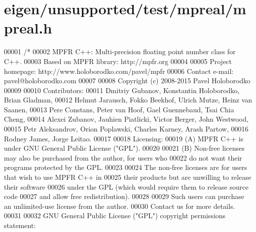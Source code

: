 \hypertarget{eigen_2unsupported_2test_2mpreal_2mpreal_8h_source}{}\section{eigen/unsupported/test/mpreal/mpreal.h}
\label{eigen_2unsupported_2test_2mpreal_2mpreal_8h_source}

\begin{DoxyCode}
00001 \textcolor{comment}{/*}
00002 \textcolor{comment}{    MPFR C++: Multi-precision floating point number class for C++.}
00003 \textcolor{comment}{    Based on MPFR library:    http://mpfr.org}
00004 \textcolor{comment}{}
00005 \textcolor{comment}{    Project homepage:    http://www.holoborodko.com/pavel/mpfr}
00006 \textcolor{comment}{    Contact e-mail:      pavel@holoborodko.com}
00007 \textcolor{comment}{}
00008 \textcolor{comment}{    Copyright (c) 2008-2015 Pavel Holoborodko}
00009 \textcolor{comment}{}
00010 \textcolor{comment}{    Contributors:}
00011 \textcolor{comment}{    Dmitriy Gubanov, Konstantin Holoborodko, Brian Gladman,}
00012 \textcolor{comment}{    Helmut Jarausch, Fokko Beekhof, Ulrich Mutze, Heinz van Saanen,}
00013 \textcolor{comment}{    Pere Constans, Peter van Hoof, Gael Guennebaud, Tsai Chia Cheng,}
00014 \textcolor{comment}{    Alexei Zubanov, Jauhien Piatlicki, Victor Berger, John Westwood,}
00015 \textcolor{comment}{    Petr Aleksandrov, Orion Poplawski, Charles Karney, Arash Partow,}
00016 \textcolor{comment}{    Rodney James, Jorge Leitao.}
00017 \textcolor{comment}{}
00018 \textcolor{comment}{    Licensing:}
00019 \textcolor{comment}{    (A) MPFR C++ is under GNU General Public License ("GPL").}
00020 \textcolor{comment}{}
00021 \textcolor{comment}{    (B) Non-free licenses may also be purchased from the author, for users who}
00022 \textcolor{comment}{        do not want their programs protected by the GPL.}
00023 \textcolor{comment}{}
00024 \textcolor{comment}{        The non-free licenses are for users that wish to use MPFR C++ in}
00025 \textcolor{comment}{        their products but are unwilling to release their software}
00026 \textcolor{comment}{        under the GPL (which would require them to release source code}
00027 \textcolor{comment}{        and allow free redistribution).}
00028 \textcolor{comment}{}
00029 \textcolor{comment}{        Such users can purchase an unlimited-use license from the author.}
00030 \textcolor{comment}{        Contact us for more details.}
00031 \textcolor{comment}{}
00032 \textcolor{comment}{    GNU General Public License ("GPL") copyright permissions statement:}

\end{DoxyCode}
